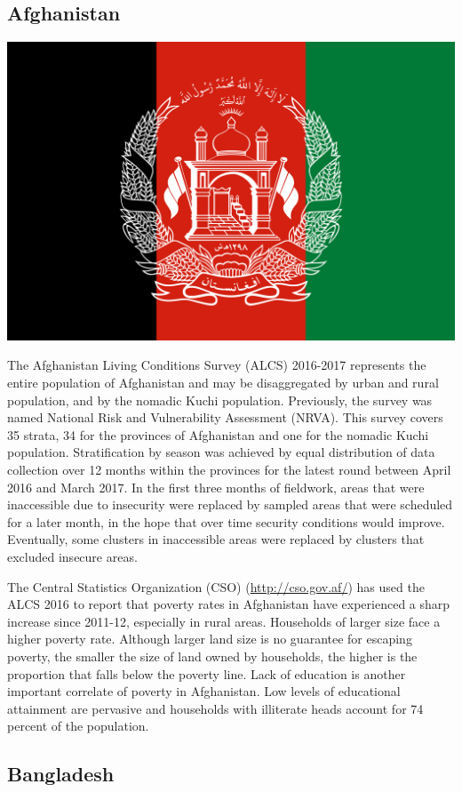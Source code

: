 \documentclass[13 pt,]{book}
\begin{document}
\subsection{Afghanistan}\label{afghanistan}

\begin{flushleft}\includegraphics[width=0.4\linewidth]{figures/Flag_of_Afghanistan} \end{flushleft}

The Afghanistan Living Conditions Survey (ALCS) 2016-2017 represents the
entire population of Afghanistan and may be disaggregated by urban and
rural population, and by the nomadic Kuchi population. Previously, the
survey was named National Risk and Vulnerability Assessment (NRVA). This
survey covers 35 strata, 34 for the provinces of Afghanistan and one for
the nomadic Kuchi population. Stratification by season was achieved by
equal distribution of data collection over 12 months within the
provinces for the latest round between April 2016 and March 2017. In the
first three months of fieldwork, areas that were inaccessible due to
insecurity were replaced by sampled areas that were scheduled for a
later month, in the hope that over time security conditions would
improve. Eventually, some clusters in inaccessible areas were replaced
by clusters that excluded insecure areas.

The Central Statistics Organization (CSO) (\url{http://cso.gov.af/}) has
used the ALCS 2016 to report that poverty rates in Afghanistan have
experienced a sharp increase since 2011-12, especially in rural areas.
Households of larger size face a higher poverty rate. Although larger
land size is no guarantee for escaping poverty, the smaller the size of
land owned by households, the higher is the proportion that falls below
the poverty line. Lack of education is another important correlate of
poverty in Afghanistan. Low levels of educational attainment are
pervasive and households with illiterate heads account for 74 percent of
the population.

\subsection{Bangladesh}\label{bangladesh}
\end{document}
